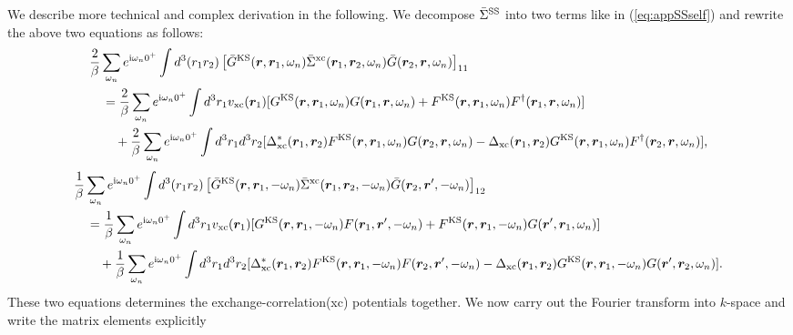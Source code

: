 We describe more technical and complex derivation in the following.
We decompose $\bar{\Sigma}^{\rm SS} $ into two terms like in (\ref{eq:appSSself}) and rewrite the 
above two equations as follows:
%
\begin{equation}
	\begin{split}
	& \frac{2}{\beta} \sum_{\omega_n}
	e^{ {\rm i}\omega_n 0^{+}} 
	\int d^3(r_1 r_2) \left[ \bar{G}^{\rm KS}(\bm r, \bm r_1, \omega_n)
	\bar{\Sigma }^{\rm xc}(\bm r_1, \bm r_2, \omega_n) \bar{G}(\bm r_2, \bm r, \omega_n)
	\right]_{11} \\
	&\quad =
	\frac{2}{\beta}\sum_{\omega_n} e^{ {\rm i}\omega_n 0^{+}}\int d^3r_1 
	v_{\rm xc}(\bm r_1) [G^{\rm KS}(\bm r,\bm r_1,\omega_n)G(\bm r_1, \bm r, \omega_n)+
	F^{\rm KS}(\bm r, \bm r_1, \omega_n)F^{\dag}(\bm r_1, \bm r, \omega_n)] \\
	&\quad \quad + 
	\frac{2}{\beta}\sum_{\omega_n}e^{ {\rm i}\omega_n 0^{+}}
	\int d^3r_1 d^3r_2 
	[\Delta_{\rm xc}^{\ast}(\bm r_1, \bm r_2)
	F^{\rm KS}(\bm r,\bm r_1, \omega_n)G(\bm r_2, \bm r, \omega_n) 
	- \Delta_{\rm xc}(\bm r_1, \bm r_2)
	G^{\rm KS}(\bm r,\bm r_1, \omega_n)F^{\dag}(\bm r_2, \bm r, \omega_n) 
	],
	\label{eq:11comp1}
\end{split}
\end{equation}
%
\begin{equation}
	\begin{split}
	& \frac{1}{\beta} \sum_{\omega_n}
	e^{ {\rm i}\omega_n 0^{+}} 
	\int d^3(r_1 r_2) \left[ \bar{G}^{\rm KS}(\bm r, \bm r_1, -\omega_n)
	\bar{\Sigma }^{\rm xc}(\bm r_1, \bm r_2, -\omega_n) \bar{G}(\bm r_2, \bm r', -\omega_n)
	\right]_{12} \\
	&\quad =
	\frac{1}{\beta}\sum_{\omega_n} e^{ {\rm i}\omega_n 0^{+}}\int d^3r_1 
	v_{\rm xc}(\bm r_1) [G^{\rm KS}(\bm r,\bm r_1,-\omega_n)F(\bm r_1, \bm r', -\omega_n)+
	F^{\rm KS}(\bm r, \bm r_1, -\omega_n)G(\bm r', \bm r_1, \omega_n)] \\
	&\quad \quad + 
	\frac{1}{\beta}\sum_{\omega_n}e^{ {\rm i}\omega_n 0^{+}}
	\int d^3r_1 d^3r_2 
	[\Delta_{\rm xc}^{\ast}(\bm r_1, \bm r_2)
	F^{\rm KS}(\bm r,\bm r_1, -\omega_n)F(\bm r_2, \bm r', -\omega_n) 
	- \Delta_{\rm xc}(\bm r_1, \bm r_2)
	G^{\rm KS}(\bm r,\bm r_1, -\omega_n)G(\bm r', \bm r_2, \omega_n) 
	].
	\label{eq:12comp1}
\end{split}
\end{equation}
%
These two equations determines the exchange-correlation(xc) potentials together.
We now carry out the Fourier transform into $k$-space and write the matrix elements explicitly
